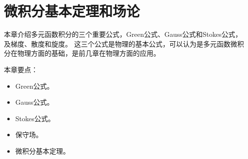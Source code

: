 \chapter{微积分基本定理和场论}

本章介绍多元函数积分的三个重要公式，Green公式、Gauss公式和Stokes公式，及梯度、散度和旋度。
这三个公式是物理的基本公式，可以认为是多元函数微积分在物理方面的基础，是前几章在物理方面的应用。

本章要点：
\begin{itemize}
    \item Green公式。
    \item Gauss公式。
    \item Stokes公式。
    \item 保守场。
    \item 微积分基本定理。
\end{itemize}

~

\newpage


\newpage


\newpage


\newpage


\newpage


\newpage


\newpage





